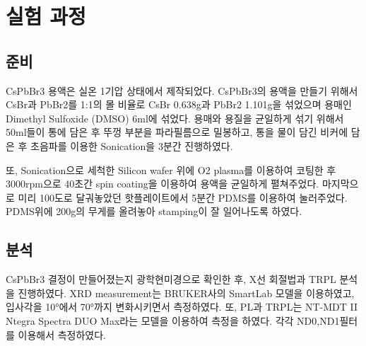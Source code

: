 \section{실험 과정}

\subsection{준비}
CsPbBr3 용액은 실온 1기압 상태에서 제작되었다. CsPbBr3의 용액을 만들기 위해서 CsBr과 PbBr2를 1:1의 몰 비율로 CsBr 0.638g과 PbBr2 1.101g을 섞었으며 용매인 Dimethyl Sulfoxide (DMSO) 6ml에 섞었다. 용매와 용질을 균일하게 섞기 위해서 50ml들이 통에 담은 후 뚜껑 부분을 파라필름으로 밀봉하고, 통을 물이 담긴 비커에 담은 후 초음파를 이용한 Sonication을 3분간 진행하였다. 

또, Sonication으로 세척한 Silicon wafer 위에 O2 plasma를 이용하여 코팅한 후 3000rpm으로 40초간 spin coating을 이용하여 용액을 균일하게 펼쳐주었다. 마지막으로 미리 100도로 달궈놓았던 핫플레이트에서 5분간 PDMS를 이용하여 눌러주었다. PDMS위에 200g의 무게를 올려놓아 stamping이 잘 일어나도록 하였다. 

\subsection{분석}
CsPbBr3 결정이 만들어졌는지 광학현미경으로 확인한 후, X선 회절법과 TRPL 분석을 진행하였다. XRD measurement는 BRUKER사의 SmartLab 모델을 이용하였고, 입사각을 10°에서 70°까지 변화시키면서 측정하였다. 또, PL과 TRPL는 NT-MDT II Ntegra Spectra DUO Max라는 모델을 이용하여 측정을 하였다. 각각 ND0,ND1필터를 이용해서 측정하였다.
